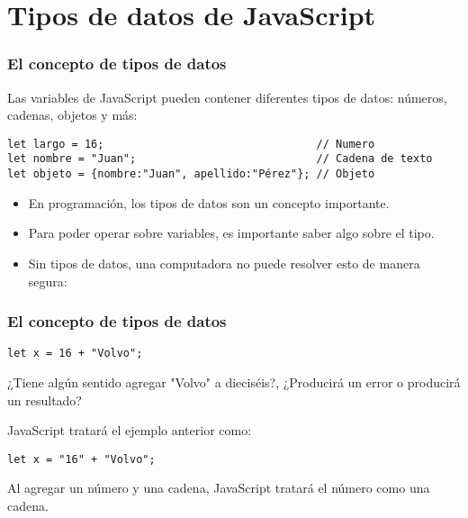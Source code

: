 
\section{Tipos de datos de JavaScript}

\begin{frame}[fragile]
  \frametitle{El concepto de tipos de datos}

  Las variables de JavaScript pueden contener diferentes tipos de datos:
  números, cadenas, objetos y más:

  \vspace{\baselineskip}
  \begin{lstlisting}
let largo = 16;                                 // Numero
let nombre = "Juan";                            // Cadena de texto
let objeto = {nombre:"Juan", apellido:"Pérez"}; // Objeto 
  \end{lstlisting}

  \begin{itemize}
    \item En programación, los tipos de datos son un concepto importante.
    \item Para poder operar sobre variables, es importante saber algo sobre el tipo.
    \item Sin tipos de datos, una computadora no puede resolver esto de manera segura:
  \end{itemize}
\end{frame}

\begin{frame}[fragile]
  \frametitle{El concepto de tipos de datos}

  \begin{lstlisting}
let x = 16 + "Volvo";
  \end{lstlisting}

  \vspace{\baselineskip}
  ¿Tiene algún sentido agregar "Volvo" a dieciséis?,
  ¿Producirá un error o producirá un resultado?

  JavaScript tratará el ejemplo anterior como:

  \vspace{\baselineskip}
  \begin{lstlisting}
let x = "16" + "Volvo";
  \end{lstlisting}

  \begin{block}{}
    Al agregar un número y una cadena, JavaScript tratará el
    número como una cadena.
  \end{block}
\end{frame}

